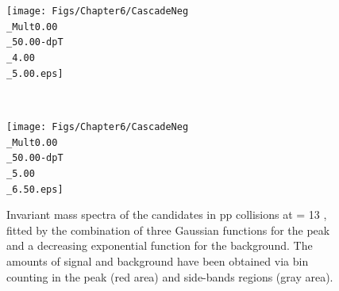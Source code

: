 \begin{landscape}
\begin{figure}[h]
\begin{minipage}[t]{.25\textwidth}
    \end{minipage}
    \hfill
    \begin{minipage}[t]{.25\textwidth}
		\hspace*{-2.5cm}
        \texttt{[image: Figs/Chapter6/CascadeNeg\\\_Mult0.00\\\_50.00-dpT\\\_4.00\\\_5.00.eps]}
    \end{minipage}  \\
    \begin{minipage}[t]{.25\textwidth}
        \hspace*{-2.5cm}
        \texttt{[image: Figs/Chapter6/CascadeNeg\\\_Mult0.00\\\_50.00-dpT\\\_5.00\\\_6.50.eps]}
    \end{minipage}
    \hfill
   	\caption{Invariant mass spectra of the \rmXiM candidates in pp collisions at \sqrtS = 13 \tev, fitted by the combination of three Gaussian functions for the peak and a decreasing exponential function for the background. The amounts of signal and background have been obtained via bin counting in the peak (red area) and side-bands regions (gray area).}
	\label{fig:InvMassXiMinusVPt}
\end{figure}


\end{landscape}
